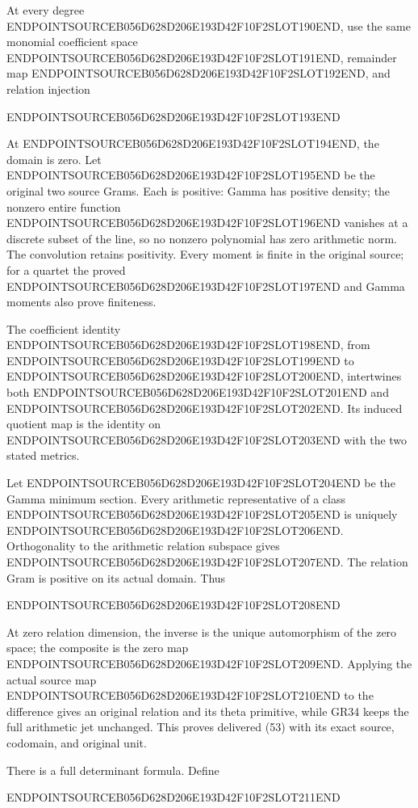 At every degree ENDPOINTSOURCEB056D628D206E193D42F10F2SLOT190END, use the same monomial coefficient space ENDPOINTSOURCEB056D628D206E193D42F10F2SLOT191END, remainder map ENDPOINTSOURCEB056D628D206E193D42F10F2SLOT192END, and relation injection

ENDPOINTSOURCEB056D628D206E193D42F10F2SLOT193END

At ENDPOINTSOURCEB056D628D206E193D42F10F2SLOT194END, the domain is zero. Let ENDPOINTSOURCEB056D628D206E193D42F10F2SLOT195END be the original two source Grams. Each is positive: Gamma has positive density; the nonzero entire function ENDPOINTSOURCEB056D628D206E193D42F10F2SLOT196END vanishes at a discrete subset of the line, so no nonzero polynomial has zero arithmetic norm. The convolution retains positivity. Every moment is finite in the original source; for a quartet the proved ENDPOINTSOURCEB056D628D206E193D42F10F2SLOT197END and Gamma moments also prove finiteness.

The coefficient identity ENDPOINTSOURCEB056D628D206E193D42F10F2SLOT198END, from ENDPOINTSOURCEB056D628D206E193D42F10F2SLOT199END to ENDPOINTSOURCEB056D628D206E193D42F10F2SLOT200END, intertwines both ENDPOINTSOURCEB056D628D206E193D42F10F2SLOT201END and ENDPOINTSOURCEB056D628D206E193D42F10F2SLOT202END. Its induced quotient map is the identity on ENDPOINTSOURCEB056D628D206E193D42F10F2SLOT203END with the two stated metrics.

Let ENDPOINTSOURCEB056D628D206E193D42F10F2SLOT204END be the Gamma minimum section. Every arithmetic representative of a class ENDPOINTSOURCEB056D628D206E193D42F10F2SLOT205END is uniquely ENDPOINTSOURCEB056D628D206E193D42F10F2SLOT206END. Orthogonality to the arithmetic relation subspace gives ENDPOINTSOURCEB056D628D206E193D42F10F2SLOT207END. The relation Gram is positive on its actual domain. Thus

ENDPOINTSOURCEB056D628D206E193D42F10F2SLOT208END

At zero relation dimension, the inverse is the unique automorphism of the zero space; the composite is the zero map ENDPOINTSOURCEB056D628D206E193D42F10F2SLOT209END. Applying the actual source map ENDPOINTSOURCEB056D628D206E193D42F10F2SLOT210END to the difference gives an original relation and its theta primitive, while GR34 keeps the full arithmetic jet unchanged. This proves delivered (53) with its exact source, codomain, and original unit.

There is a full determinant formula. Define

ENDPOINTSOURCEB056D628D206E193D42F10F2SLOT211END

